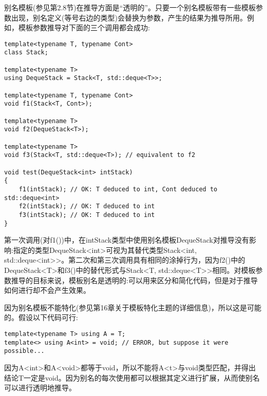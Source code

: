 别名模板(参见第2.8节)在推导方面是“透明的”。只要一个别名模板带有一些模板参数出现，别名定义(等号右边的类型)会替换为参数，产生的结果为推导所用。例如，模板参数推导对下面的三个调用都会成功:

\begin{lstlisting}[style=styleCXX]
template<typename T, typename Cont>
class Stack;

template<typename T>
using DequeStack = Stack<T, std::deque<T>>;

template<typename T, typename Cont>
void f1(Stack<T, Cont>);

template<typename T>
void f2(DequeStack<T>);

template<typename T>
void f3(Stack<T, std::deque<T>); // equivalent to f2

void test(DequeStack<int> intStack)
{
	f1(intStack); // OK: T deduced to int, Cont deduced to std::deque<int>
	f2(intStack); // OK: T deduced to int
	f3(intStack); // OK: T deduced to int
}
\end{lstlisting}

第一次调用(对f1())中，在intStack类型中使用别名模板DequeStack对推导没有影响:指定的类型DequeStack<int>可视为其替代类型Stack<int, std::deque<int>{}>。第二次和第三次调用具有相同的涂掉行为，因为f2()中的DequeStack<T>和f3()中的替代形式与Stack<T, std::deque<T>{}>相同。对模板参数推导的目标来说，模板别名是透明的:可以用来区分和简化代码，但是对于推导如何进行却不会产生效果。

因为别名模板不能特化(参见第16章关于模板特化主题的详细信息)，所以这是可能的。假设以下代码可行:

\begin{lstlisting}[style=styleCXX]
template<typename T> using A = T;
template<> using A<int> = void; // ERROR, but suppose it were possible...
\end{lstlisting}

因为A<int>和A<void>都等于void，所以不能将A<t>与void类型匹配，并得出结论T一定是void。因为别名的每次使用都可以根据其定义进行扩展，从而使别名可以进行透明地推导。

























